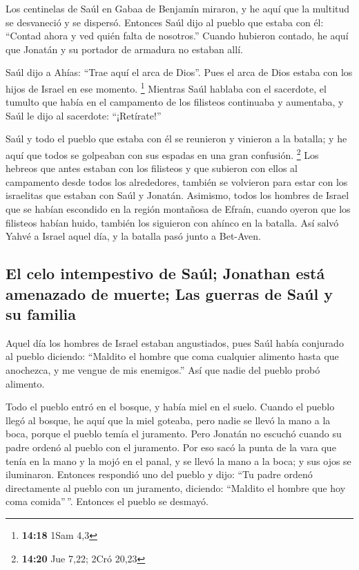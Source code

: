 \begin{paracol}{2}
 Los centinelas de Saúl en Gabaa de Benjamín miraron, y
he aquí que la multitud se desvaneció y se dispersó. 
Entonces Saúl dijo al pueblo que estaba con él: ``Contad ahora y ved
quién falta de nosotros.'' Cuando hubieron contado, he aquí que Jonatán
y su portador de armadura no estaban allí.

 Saúl dijo a Ahías: ``Trae aquí el arca de Dios''. Pues
el arca de Dios estaba con los hijos de Israel en ese momento.
\footnote{\textbf{14:18} 1Sam 4,3}  Mientras Saúl hablaba
con el sacerdote, el tumulto que había en el campamento de los filisteos
continuaba y aumentaba, y Saúl le dijo al sacerdote: ``¡Retírate!''

 Saúl y todo el pueblo que estaba con él se reunieron y
vinieron a la batalla; y he aquí que todos se golpeaban con sus espadas
en una gran confusión. \footnote{\textbf{14:20} Jue 7,22; 2Cró 20,23}
 Los hebreos que antes estaban con los filisteos y que
subieron con ellos al campamento desde todos los alrededores, también se
volvieron para estar con los israelitas que estaban con Saúl y Jonatán.
 Asimismo, todos los hombres de Israel que se habían
escondido en la región montañosa de Efraín, cuando oyeron que los
filisteos habían huido, también los siguieron con ahínco en la batalla.
 Así salvó Yahvé a Israel aquel día, y la batalla pasó
junto a Bet-Aven.

\hypertarget{el-celo-intempestivo-de-sauxfal-jonathan-estuxe1-amenazado-de-muerte-las-guerras-de-sauxfal-y-su-familia}{%
\subsection{El celo intempestivo de Saúl; Jonathan está amenazado de
muerte; Las guerras de Saúl y su
familia}\label{el-celo-intempestivo-de-sauxfal-jonathan-estuxe1-amenazado-de-muerte-las-guerras-de-sauxfal-y-su-familia}}

 Aquel día los hombres de Israel estaban angustiados,
pues Saúl había conjurado al pueblo diciendo: ``Maldito el hombre que
coma cualquier alimento hasta que anochezca, y me vengue de mis
enemigos.'' Así que nadie del pueblo probó alimento.

 Todo el pueblo entró en el bosque, y había miel en el
suelo.  Cuando el pueblo llegó al bosque, he aquí que la
miel goteaba, pero nadie se llevó la mano a la boca, porque el pueblo
temía el juramento.  Pero Jonatán no escuchó cuando su
padre ordenó al pueblo con el juramento. Por eso sacó la punta de la
vara que tenía en la mano y la mojó en el panal, y se llevó la mano a la
boca; y sus ojos se iluminaron.  Entonces respondió uno
del pueblo y dijo: ``Tu padre ordenó directamente al pueblo con un
juramento, diciendo: ``Maldito el hombre que hoy coma comida''\,''.
Entonces el pueblo se desmayó.


\end{paracol}
